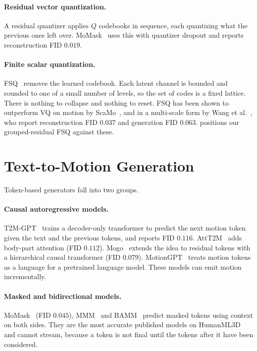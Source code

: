 \paragraph{Residual vector quantization.} A residual quantizer applies $Q$ codebooks in sequence, each quantizing what the previous ones left over. MoMask~\cite{guo2024momask} uses this with quantizer dropout and reports reconstruction FID $0.019$.

\paragraph{Finite scalar quantization.} FSQ~\cite{mentzer2023fsq} removes the learned codebook. Each latent channel is bounded and rounded to one of a small number of levels, so the set of codes is a fixed lattice. There is nothing to collapse and nothing to reset. FSQ has been shown to outperform VQ on motion by ScaMo~\cite{lu2024scamo}, and in a multi-scale form by Wang et al.~\cite{wang2025stmsq}, who report reconstruction FID $0.037$ and generation FID $0.063$.  positions our grouped-residual FSQ against these.

\section{Text-to-Motion Generation}
\label{sec:bg_generation}

Token-based generators fall into two groups.

\paragraph{Causal autoregressive models.} T2M-GPT~\cite{zhang2023t2mgpt} trains a decoder-only transformer to predict the next motion token given the text and the previous tokens, and reports FID $0.116$. AttT2M~\cite{zhong2023attt2m} adds body-part attention (FID $0.112$). Mogo~\cite{fu2024mogo} extends the idea to residual tokens with a hierarchical causal transformer (FID $0.079$). MotionGPT~\cite{jiang2023motiongpt} treats motion tokens as a language for a pretrained language model. These models can emit motion incrementally.

\paragraph{Masked and bidirectional models.} MoMask~\cite{guo2024momask} (FID $0.045$), MMM~\cite{pinyoanuntapong2023mmm} and BAMM~\cite{pinyoanuntapong2024bamm} predict masked tokens using context on both sides. They are the most accurate published models on HumanML3D and cannot stream, because a token is not final until the tokens after it have been considered.

